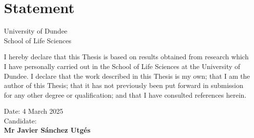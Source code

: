 \chapter*{Statement}

\begin{center}
    \LARGE University of Dundee\\[1cm]
    \LARGE School of Life Sciences\\[2cm]
\end{center}

I hereby declare that this Thesis is based on results obtained from research which I have personally carried out in the School of Life Sciences at the University of Dundee. I declare that the work described in this Thesis is my own; that I am the author of this Thesis; that it has not previously been put forward in submission for any other degree or qualification; and that I have consulted references herein.

\vfill

\begin{flushright}
    Date: 4 March 2025\\[1cm]
    Candidate:{\hspace{2cm}}
    \\[1cm]
    \textbf{Mr Javier Sánchez Utgés}
\end{flushright}